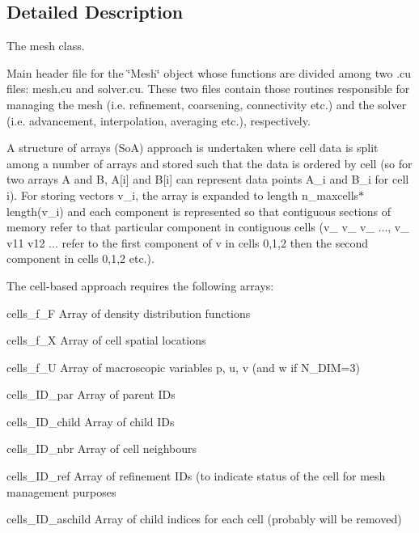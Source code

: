 \subsection{Detailed Description}
The mesh class. 

Main header file for the \char`\"{}\+Mesh\char`\"{} object whose functions are divided among two .cu files\+: mesh.\+cu and solver.\+cu. These two files contain those routines responsible for managing the mesh (i.\+e. refinement, coarsening, connectivity etc.) and the solver (i.\+e. advancement, interpolation, averaging etc.), respectively.

A structure of arrays (SoA) approach is undertaken where cell data is split among a number of arrays and stored such that the data is ordered by cell (so for two arrays A and B, A\mbox{[}i\mbox{]} and B\mbox{[}i\mbox{]} can represent data points A\+\_\+i and B\+\_\+i for cell i). For storing vectors v\+\_\+i, the array is expanded to length n\+\_\+maxcells$\ast$length(v\+\_\+i) and each component is represented so that contiguous sections of memory refer to that particular component in contiguous cells (v\+\_ v\+\_ v\+\_ ..., v\+\_ v11 v12 ... refer to the first component of v in cells 0,1,2 then the second component in cells 0,1,2 etc.).

The cell-\/based approach requires the following arrays\+:
\begin{DoxyItemize}
\item cells\+\_\+f\+\_\+F Array of density distribution functions
\item cells\+\_\+f\+\_\+X Array of cell spatial locations
\item cells\+\_\+f\+\_\+U Array of macroscopic variables p, u, v (and w if N\+\_\+\+D\+IM=3)
\item cells\+\_\+\+I\+D\+\_\+par Array of parent I\+Ds
\item cells\+\_\+\+I\+D\+\_\+child Array of child I\+Ds
\item cells\+\_\+\+I\+D\+\_\+nbr Array of cell neighbours
\item cells\+\_\+\+I\+D\+\_\+ref Array of refinement I\+Ds (to indicate status of the cell for mesh management purposes
\item cells\+\_\+\+I\+D\+\_\+aschild Array of child indices for each cell (probably will be removed)
\end{DoxyItemize}

